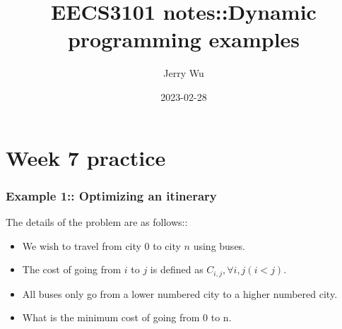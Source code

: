 \documentclass[12pt]{book}
\title{EECS3101 notes::Dynamic programming examples}
\author{Jerry Wu}
\date{2023-02-28}
\begin{document}
\maketitle

\chapter*{Week 7 practice}

\subsection*{Example 1:: Optimizing an itinerary}

The details of the problem are as follows::

\begin{itemize}
    \item We wish to travel from city 0 to city $n$ using buses.
    \item The cost of going from $i$ to $j$ is defined as $C_{i,j}, \forall i,j(i<j)$.
    \item All buses only go from a lower numbered city to a higher numbered city.
    \item What is the minimum cost of going from 0 to n.
\end{itemize}
\end{document}
